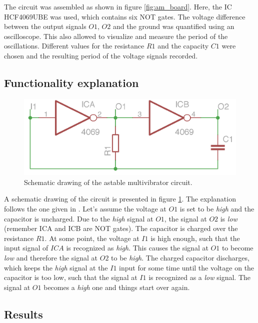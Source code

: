 \documentclass[journal]{IEEEtran}
\begin{document}
The circuit was assembled as shown in figure \ref{fig:am_board}. Here, the IC
HCF4069UBE was used, which contains six NOT gates. The voltage difference
between the output signals $O1$, $O2$ and the ground was quantified using an
oscilloscope. This also allowed to visualize and measure the period of the
oscillations.
Different values for the resistance $R1$ and the capacity $C1$ were chosen and
the resulting period of the voltage signals recorded.

\subsection{Functionality explanation}

\begin{figure}[h!]
  \centering
   \includegraphics[]{boards/am_overview.png}
   \caption{Schematic drawing of the astable multivibrator circuit.}
   \label{fig:am_scheme}
\end{figure}

A schematic drawing of the circuit is presented in figure \ref{fig:am_scheme}.
The explanation follows the one given in \cite{book_dg}. Let's assume the
voltage at $O1$ is set to be \emph{high} and the capacitor is uncharged. Due to
the \emph{high} signal at $O1$, the signal at $O2$ is \emph{low} (remember ICA
and ICB are NOT gates).
The capacitor is charged over the resistance $R1$. At some point, the voltage at
$I1$ is high enough, such that the input signal of $ICA$ is recognized as \emph{high}. This causes the
signal at $O1$ to become \emph{low} and therefore the signal at $O2$ to be
\emph{high}. The charged capacitor discharges, which keeps the \emph{high}
signal at the $I1$ input for some time until the voltage on the capacitor is too
low, such that the signal at $I1$ is recognized as a \emph{low} signal. The
signal at $O1$ becomes a \emph{high} one and things start over again.

\subsection{Results}
\end{document}
